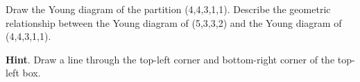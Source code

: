 \documentclass{book}
\begin{document}
\setcounter{cpjt}{303}
\addtocounter{cpjt}{-1}
\begin{activity}\label{activity-296}
\hypertarget{p-1499}{}%
Draw the Young diagram of the partition (4,4,3,1,1). Describe the geometric relationship between the Young diagram of (5,3,3,2) and the Young diagram of (4,4,3,1,1).%
\par\smallskip%
\noindent\textbf{Hint}.\hypertarget{hint-189}{}\quad%
\hypertarget{p-1500}{}%
Draw a line through the top-left corner and bottom-right corner of the top-left box.%
\par\smallskip%
\noindent\end{activity}

\clearpage
\end{document}
